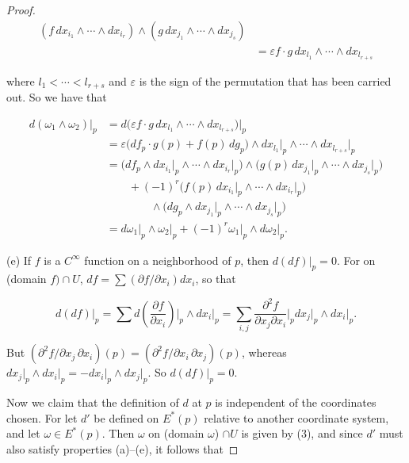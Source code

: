 \begin{proof}
\[
\begin{split}(f\, dx_{i_{1}}\wedge\cdots\wedge dx_{i_{r}})\wedge(g\, dx_{j_{1}}\wedge\cdots\wedge dx_{j_{s}})&\\&=\varepsilon f\cdot g\, dx_{l_{1}}\wedge\cdots\wedge dx_{l_{r+s}}\end{split}
\]

where  $ l_{1} < \cdots < l_{r+s} $ and  $ \varepsilon $ is the sign of the permutation that has been carried out. So we have that

\begin{align*}d(\omega_{1}\wedge\omega_{2})\big|_{p}&=d\big(\varepsilon f\cdot g\, dx_{l_{1}}\wedge\cdots\wedge dx_{l_{r+s}}\big)\big|_{p}\\&=\varepsilon\big(df_{p}\cdot g(p)+f(p)\, dg_{p}\big)\wedge dx_{l_{1}}\big|_{p}\wedge\cdots\wedge dx_{l_{r+s}}\big|_{p}\\&=\big(df_{p}\wedge dx_{i_{1}}\big|_{p}\wedge\cdots\wedge dx_{i_{r}}\big|_{p}\big)\wedge\big(g(p)\, dx_{j_{1}}\big|_{p}\wedge\cdots\wedge dx_{j_{s}}\big|_{p}\big)\\&\qquad+(-1)^{r}\big(f(p)\, dx_{i_{1}}\big|_{p}\wedge\cdots\wedge dx_{i_{r}}\big|_{p}\big)\\&\qquad\qquad\wedge\big(dg_{p}\wedge dx_{j_{1}}\big|_{p}\wedge\cdots\wedge dx_{j_{s}}\big|_{p}\big)\\&=d\omega_{1}\big|_{p}\wedge\omega_{2}\big|_{p}+(-1)^{r}\omega_{1}\big|_{p}\wedge d\omega_{2}\big|_{p}.\end{align*}

(e) If $f$ is a $C^\infty$ function on a neighborhood of $p$, then $d(df)|_{p}=0$. For on (domain $f)\cap U$, $df=\sum(\partial f/\partial x_i)dx_i$, so that

\[
d(d f)|_{p}=\sum d\left(\frac{\partial f}{\partial x_{i}}\right)\Bigg|_{p}\wedge d x_{i}\big|_{p}=\sum_{i,j}\frac{\partial^{2}f}{\partial x_{j}\partial x_{i}}\Bigg|_{p}d x_{j}\big|_{p}\wedge d x_{i}\big|_{p}.
\]

But  $ (\partial^2f/\partial x_j\,\partial x_i)(p)=(\partial^2f/\partial x_i\,\partial x_j)(p) $, whereas  $ dx_j\big|_{p}\wedge dx_i\big|_{p}=-dx_i\big|_{p}\wedge dx_j\big|_{p} $. So  $ d(df)\big|_{p}=0 $.

Now we claim that the definition of $d$ at $p$ is independent of the coordinates chosen. For let $d'$ be defined on $E^*(p)$ relative to another coordinate system, and let $\omega \in E^*(p)$. Then $\omega$ on (domain $\omega$) $\cap U$ is given by (3), and since $d'$ must also satisfy properties (a)–(e), it follows that


\end{proof}
